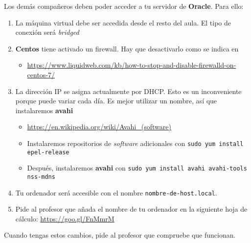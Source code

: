 \begin{homeworkProblem}

  Los demás compañeros deben poder acceder a tu servidor de \textbf{Oracle}. Para ello:
  \begin{enumerate}
  \item La máquina virtual debe ser accedida desde el resto del aula. El tipo de conexión será \textit{bridged}
  \item \textbf{Centos} tiene activado un firewall. Hay que desactivarlo como se indica en
    \begin{itemize}
    \item  \url{https://www.liquidweb.com/kb/how-to-stop-and-disable-firewalld-on-centos-7/}
    \end{itemize}
    
  \item La dirección IP se asigna actualmente por DHCP. Esto es un inconveniente porque puede variar cada día. Es mejor utilizar un nombre, así que instalaremos \textbf{avahi}
    \begin{itemize}
    \item \url{https://en.wikipedia.org/wiki/Avahi\_(software)}
    \item Instalaremos repositorios de \textit{software} adicionales con \texttt{sudo yum install epel-release}
    \item Después, instalaremos \textbf{avahi} con \texttt{sudo yum install avahi avahi-tools nss-mdns}

    \end{itemize}

  \item Tu ordenador será accesible con el nombre \texttt{nombre-de-host.local}.
  \item Pide al profesor que añada el nombre de tu ordenador en la siguiente hoja de cálculo: \url{https://goo.gl/FnMmrM}
    
    
  \end{enumerate}

  Cuando tengas estos cambios, pide al profesor que compruebe que funcionan.
\end{homeworkProblem}


